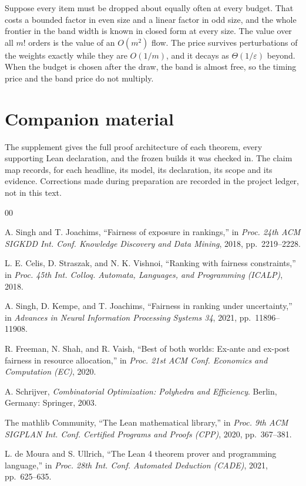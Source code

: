 Suppose every item must be dropped about equally often at every budget. That costs a
bounded factor in even size and a linear factor in odd size, and the whole frontier in the
band width is known in closed form at every size. The value over all $m!$ orders is the value
of an $O(m^{2})$ flow. The price survives perturbations of the weights exactly while they are
$O(1/m)$, and it decays as $\Theta(1/\varepsilon)$ beyond. When the budget is chosen after
the draw, the band is almost free, so the timing price and the band price do not multiply.

\section*{Companion material}
The supplement gives the full proof architecture of each theorem, every supporting Lean
declaration, and the frozen builds it was checked in. The claim map records, for each
headline, its model, its declaration, its scope and its evidence. Corrections made during
preparation are recorded in the project ledger, not in this text.

\begin{thebibliography}{00}

 A. Singh and T. Joachims, ``Fairness of exposure in rankings,'' in
\emph{Proc. 24th ACM SIGKDD Int. Conf. Knowledge Discovery and Data Mining}, 2018,
pp.~2219--2228.

 L. E. Celis, D. Straszak, and N. K. Vishnoi, ``Ranking with fairness
constraints,'' in \emph{Proc. 45th Int. Colloq. Automata, Languages, and Programming
(ICALP)}, 2018.

 A. Singh, D. Kempe, and T. Joachims, ``Fairness in ranking under
uncertainty,'' in \emph{Advances in Neural Information Processing Systems 34}, 2021,
pp.~11896--11908.

 R. Freeman, N. Shah, and R. Vaish, ``Best of both worlds: Ex-ante and
ex-post fairness in resource allocation,'' in \emph{Proc. 21st ACM Conf. Economics and
Computation (EC)}, 2020.

 A. Schrijver, \emph{Combinatorial Optimization: Polyhedra and
Efficiency}. Berlin, Germany: Springer, 2003.

 The mathlib Community, ``The Lean mathematical library,'' in
\emph{Proc. 9th ACM SIGPLAN Int. Conf. Certified Programs and Proofs (CPP)}, 2020,
pp.~367--381.

 L. de Moura and S. Ullrich, ``The Lean 4 theorem prover and
programming language,'' in \emph{Proc. 28th Int. Conf. Automated Deduction (CADE)}, 2021,
pp.~625--635.

\end{thebibliography}


